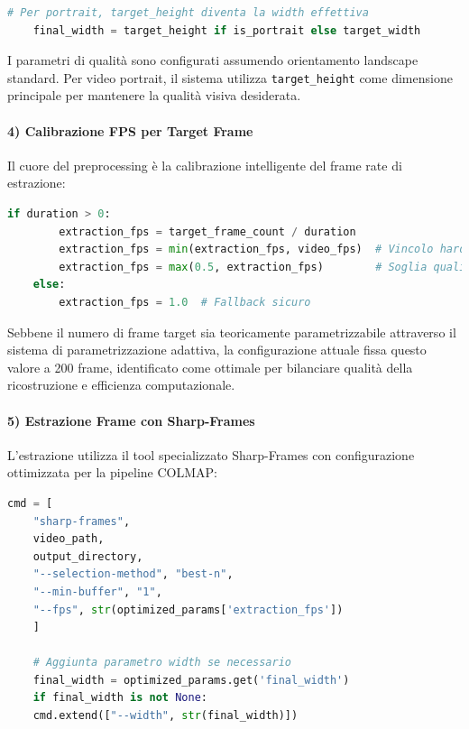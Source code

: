 \begin{lstlisting}[language=python, caption=Logica di adattamento orientamento]
	# Per portrait, target_height diventa la width effettiva
	final_width = target_height if is_portrait else target_width
\end{lstlisting}

I parametri di qualità sono configurati assumendo orientamento landscape standard. Per video portrait, il sistema utilizza \texttt{target\_height} come dimensione principale per mantenere la qualità visiva desiderata.

\paragraph{4) Calibrazione FPS per Target Frame}
Il cuore del preprocessing è la calibrazione intelligente del frame rate di estrazione:

\begin{lstlisting}[language=python, caption=Algoritmo di calibrazione FPS]
	if duration > 0:
		extraction_fps = target_frame_count / duration
		extraction_fps = min(extraction_fps, video_fps)  # Vincolo hardware
		extraction_fps = max(0.5, extraction_fps)        # Soglia qualità minima
	else:
		extraction_fps = 1.0  # Fallback sicuro
\end{lstlisting}

Sebbene il numero di frame target sia teoricamente parametrizzabile attraverso il sistema di parametrizzazione adattiva, la configurazione attuale fissa questo valore a 200 frame, identificato come ottimale per bilanciare qualità della ricostruzione e efficienza computazionale.

\paragraph{5) Estrazione Frame con Sharp-Frames}
L'estrazione utilizza il tool specializzato Sharp-Frames con configurazione ottimizzata per la pipeline COLMAP:

\begin{lstlisting}[language=python, caption=Configurazione Sharp-Frames ottimizzata]
	cmd = [
	"sharp-frames",
	video_path,
	output_directory,
	"--selection-method", "best-n",
	"--min-buffer", "1",
	"--fps", str(optimized_params['extraction_fps'])
	]
	
	# Aggiunta parametro width se necessario
	final_width = optimized_params.get('final_width')
	if final_width is not None:
	cmd.extend(["--width", str(final_width)])
\end{lstlisting}

